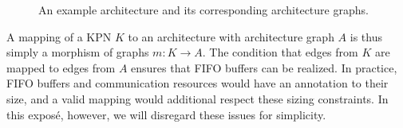 \documentclass[sigplan,10pt]{acmart}
\begin{document}
\begin{figure}[t!]
%
	\hfill
	\centering
	\caption{An example architecture and its corresponding architecture graphs.}
	\label{fig:actionsm1}
 \end{figure}
 
A mapping of a KPN $K$ to an architecture with architecture graph $A$ is thus simply a morphism of graphs $m: K \rightarrow A$. The condition that edges from $K$ are mapped to edges from $A$ ensures that FIFO buffers can be realized.
In practice, FIFO buffers and communication resources would have an annotation to their size, and a valid mapping would additional respect these sizing constraints. In this exposé, however, we will disregard these issues for simplicity.
\end{document}
